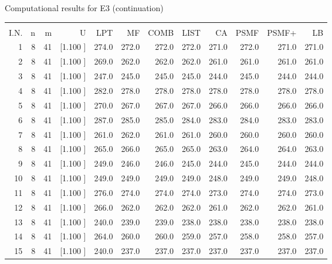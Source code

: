 \documentclass[12pt,a4paper]{article}
\begin{document}
\newpage
\begin{center}
 Computational results for E3 (continuation) {\tiny
\begin{tabular}{r r r r r r r r r r r r}\hline
    &   &   &          &        &        &        &        &        &        &        &       \\[-0.1in]
  I.N.  &  n  &  m  &  U  &  LPT  &  MF  &  COMB  &  LIST  &  CA  & PSMF &PSMF+ & LB \\[0.03in]
\hline
   1&  8& 41&[1.100     ]&   274.0&   272.0&   272.0&   272.0&   271.0&   272.0&   271.0&   271.0\\[-0.02in]
   2&  8& 41&[1.100     ]&   269.0&   262.0&   262.0&   262.0&   261.0&   261.0&   261.0&   261.0\\[-0.02in]
   3&  8& 41&[1.100     ]&   247.0&   245.0&   245.0&   245.0&   244.0&   245.0&   244.0&   244.0\\[-0.02in]
   4&  8& 41&[1.100     ]&   282.0&   278.0&   278.0&   278.0&   278.0&   278.0&   278.0&   278.0\\[-0.02in]
   5&  8& 41&[1.100     ]&   270.0&   267.0&   267.0&   267.0&   266.0&   266.0&   266.0&   266.0\\[-0.02in]
   6&  8& 41&[1.100     ]&   287.0&   285.0&   285.0&   284.0&   283.0&   284.0&   283.0&   283.0\\[-0.02in]
   7&  8& 41&[1.100     ]&   261.0&   262.0&   261.0&   261.0&   260.0&   260.0&   260.0&   260.0\\[-0.02in]
   8&  8& 41&[1.100     ]&   265.0&   266.0&   265.0&   265.0&   263.0&   264.0&   264.0&   263.0\\[-0.02in]
   9&  8& 41&[1.100     ]&   249.0&   246.0&   246.0&   245.0&   244.0&   245.0&   244.0&   244.0\\[-0.02in]
  10&  8& 41&[1.100     ]&   249.0&   249.0&   249.0&   249.0&   248.0&   249.0&   249.0&   248.0\\[-0.02in]
  11&  8& 41&[1.100     ]&   276.0&   274.0&   274.0&   274.0&   273.0&   274.0&   274.0&   273.0\\[-0.02in]
  12&  8& 41&[1.100     ]&   266.0&   262.0&   262.0&   262.0&   261.0&   262.0&   262.0&   261.0\\[-0.02in]
  13&  8& 41&[1.100     ]&   240.0&   239.0&   239.0&   238.0&   238.0&   238.0&   238.0&   238.0\\[-0.02in]
  14&  8& 41&[1.100     ]&   264.0&   260.0&   260.0&   259.0&   257.0&   258.0&   258.0&   257.0\\[-0.02in]
  15&  8& 41&[1.100     ]&   240.0&   237.0&   237.0&   237.0&   237.0&   237.0&   237.0&   237.0\\[-0.02in]

\end{tabular}}
\end{center}
\end{document}
